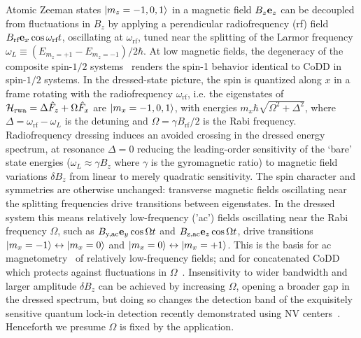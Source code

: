 \documentclass[aps,prl,reprint,superscriptaddress,floatfix]{revtex4-1}
\begin{document}

Atomic Zeeman states $\vert m_z=-1,0,1 \rangle $ in a magnetic field $B_z \mathbf{e}_z$ can be decoupled from fluctuations in $B_z$ by applying a perendicular radiofrequency (rf) field
$B_{\text{rf}} \mathbf{e}_x \cos \omega_\text{rf} t$, oscillating at $\omega_\text{rf}$, tuned near the splitting of the Larmor frequency $\omega_L \equiv (E_{m_z=+1}-E_{m_z=-1})/2\hbar$.
At low magnetic fields, the degeneracy of the composite spin-$1/2$ systems~\cite{majorana_atomi_1932} renders the spin-1 behavior identical to CoDD in spin-$1/2$ systems.
In the dressed-state picture, the spin is quantized along $x$ in a frame rotating with the radiofrequency $\omega_{\text{rf}}$, i.e. the eigenstates of $\mathcal{H}_{\text{rwa}} = \Delta \hat{F}_z + \Omega \hat{F}_x$ are $\vert m_x=-1,0,1 \rangle $, with energies $m_x \hbar \sqrt{\Omega^2 + \Delta^2}$, where $\Delta = \omega_{\text{rf}}-\omega_L$ is the detuning and $\Omega = \gamma B_{\text{rf}} / 2$ is the Rabi frequency.
Radiofrequency dressing induces an avoided crossing in the dressed energy spectrum, at resonance $\Delta=0$ reducing the leading-order sensitivity of the `bare' state energies ($\omega_L \approx \gamma B_z$ where $\gamma$ is the gyromagnetic ratio) to magnetic field variations $\delta B_z$ from linear to merely quadratic sensitivity.
The spin character and symmetries are otherwise unchanged: transverse magnetic fields oscillating near the splitting frequencies drive transitions between eigenstates.
In the dressed system this means relatively low-frequency ('ac') fields oscillating near the Rabi frequency $\Omega$, such as $B_{\text{y,ac}} \mathbf{e}_y \cos \Omega t$ and $B_{\text{z,ac}} \mathbf{e}_z \cos \Omega t$, drive transitions $\vert m_x=-1 \rangle  \leftrightarrow \vert m_x=0 \rangle $ and $\vert m_x=0 \rangle  \leftrightarrow \vert m_x=+1 \rangle $.
This is the basis for ac magnetometry~\cite{hirose_continuous_2012} of relatively low-frequency fields; and for concatenated CoDD which protects against fluctuations in $\Omega$~\cite{cai_robust_2012}.
Insensitivity to wider bandwidth and larger amplitude $\delta B_z$ can be achieved by increasing $\Omega$, opening a broader gap in the dressed spectrum, but doing so changes the detection band of the exquisitely sensitive quantum lock-in detection recently demonstrated using NV centers~\cite{boss_quantum_2017,*schmitt_submillihertz_2017}.
Henceforth we presume $\Omega$ is fixed by the application.
\end{document}
